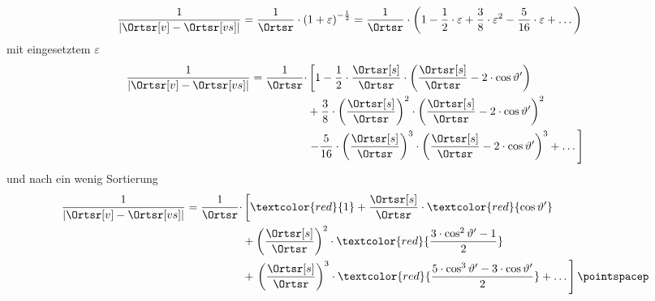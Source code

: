 \begin{frame}

  \begin{align*}
	\dfrac{1}{\left| \Ortsr[v] - \Ortsr[vs] \right|}
		&= \dfrac{1}{\Ortsr} \cdot \left( 1 + \varepsilon \right)^{-\frac{1}{2}} = \dfrac{1}{\Ortsr} \cdot \left( 1 - \dfrac{1}{2} \cdot \varepsilon + \dfrac{3}{8} \cdot \varepsilon^2 - \dfrac{5}{16} \cdot \varepsilon + \dots \right)
\end{align*}
mit eingesetztem \(\varepsilon\)
\begin{equation*}
	\begin{split}
		\dfrac{1}{\left| \Ortsr[v] - \Ortsr[vs] \right|}
			= \dfrac{1}{\Ortsr} \cdot &\left[ 1
			- \dfrac{1}{2} \cdot \dfrac{\Ortsr[s]}{\Ortsr} \cdot \left( \dfrac{\Ortsr[s]}{\Ortsr} - 2 \cdot \cos \vartheta' \right) \right. \\
			&+ \dfrac{3}{8} \cdot \left( \dfrac{\Ortsr[s]}{\Ortsr} \right)^2 \cdot \left( \dfrac{\Ortsr[s]}{\Ortsr} - 2 \cdot \cos \vartheta' \right)^2 \\
			&\left. - \dfrac{5}{16} \cdot \left( \dfrac{\Ortsr[s]}{\Ortsr} \right)^3 \cdot \left( \dfrac{\Ortsr[s]}{\Ortsr} - 2 \cdot \cos \vartheta' \right)^3  + \dots \right]
	\end{split}
\end{equation*}
und nach ein wenig Sortierung
\begin{align*}
	\begin{split}
		\dfrac{1}{\left| \Ortsr[v] - \Ortsr[vs] \right|}
			= \dfrac{1}{\Ortsr} \cdot &\left[ \textcolor{red}{1}
			+ \dfrac{\Ortsr[s]}{\Ortsr} \cdot \textcolor{red}{\cos \vartheta'} \right. \\
			&+ \left(\dfrac{\Ortsr[s]}{\Ortsr}\right)^2 \cdot \textcolor{red}{\dfrac{3 \cdot \cos^2 \vartheta' - 1}{2}} \\
			&+ \left. \left(\dfrac{\Ortsr[s]}{\Ortsr}\right)^3 \cdot \textcolor{red}{\dfrac{5 \cdot \cos^3 \vartheta' - 3 \cdot \cos \vartheta'}{2}}  + \dots \right] \pointspacep
	\end{split}
\end{align*}
\end{frame}
